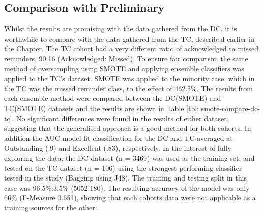 \subsection{Comparison with Preliminary}
Whilst the results are promising with the data gathered from the DC, it is worthwhile to compare with the data gathered from the TC, described earlier in the Chapter. The TC cohort had a very different ratio of acknowledged to missed reminders, 90:16 (Acknowledged: Missed). To ensure fair comparison the same method of oversampling using SMOTE and applying ensemble classifiers was applied to the TC's dataset. SMOTE was applied to the minority case, which in the TC was the missed reminder class, to the effect of 462.5\%. The results from each ensemble method were compared between the DC(SMOTE) and TC(SMOTE) datasets and the results are shown in Table \ref{tbl: smote-compare-dc-tc}. No significant differences were found in the results of either dataset, suggesting that the generalised approach is a good method for both cohorts. In addition the AUC model fit classification for the DC and TC averaged at Outstanding (.9) and Excellent (.83), respectively. In the interest of fully exploring the data, the DC dataset (n = 3469) was used as the training set, and tested on the TC dataset (n = 106) using the strongest performing classifier tested in the study (Bagging using J48). The training and testing split in this case was 96.5\%:3.5\% (5052:180).
The resulting accuracy of the model was only 66\% (F-Measure 0.651), showing that each cohorts data were not applicable as a training sources for the other.

